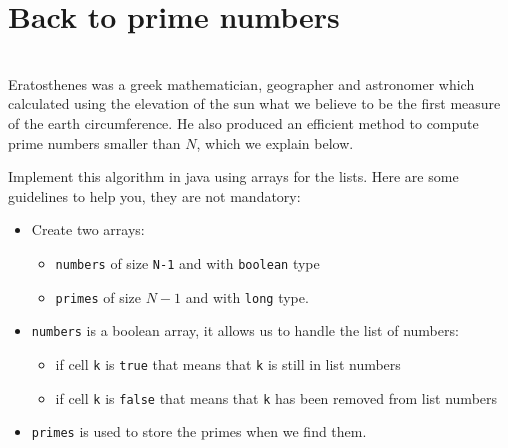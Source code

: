 \documentclass{exercices}
\renewcommand{\|}{\url|}
\begin{document}
\section{Back to prime numbers}

\begin{exercice}\\
Eratosthenes was a greek mathematician, geographer and astronomer which calculated using the
elevation of the sun what we believe to be the first measure of the earth circumference.
He also produced an efficient method to compute prime numbers smaller than $N$, which we
explain below.
\begin{center}
\end{center}

Implement this algorithm in java using arrays for the lists. Here are some guidelines to
help you, they are not mandatory:
\begin{itemize}
\item Create two arrays:
\begin{itemize}
\item \verb!numbers! of size \verb!N-1! and with \verb!boolean! type
\item \verb!primes! of size  $N-1$ and with \verb!long! type.
\end{itemize}
\item \verb!numbers! is a boolean array, it allows us to handle the list of numbers:
\begin{itemize}
\item if cell \verb!k! is \verb!true! that means that \verb!k! is still in list numbers
\item if cell \verb!k! is \verb!false! that means that \verb!k! has been removed from list numbers
\end{itemize}
\item \verb!primes! is used to store the primes when we find them.
\end{itemize}
\end{exercice}
\end{document}
